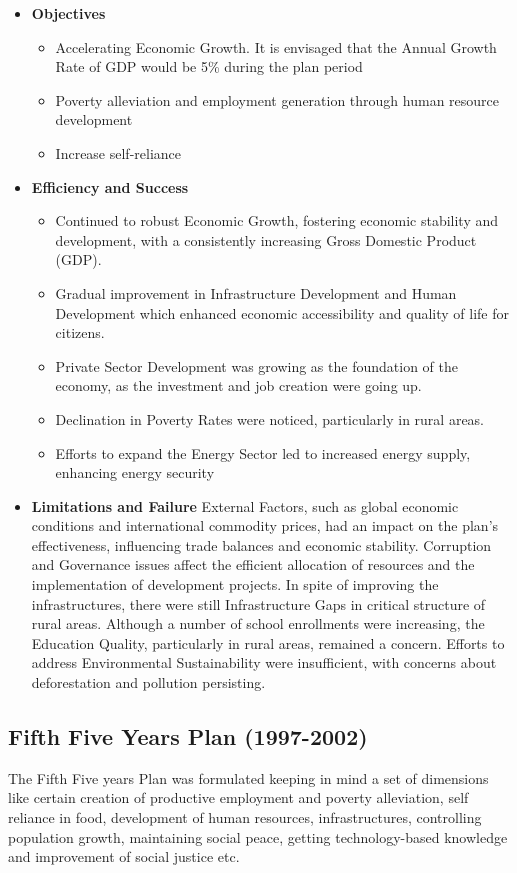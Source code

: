 \begin{itemize}
	\item\textbf{Objectives}
	\begin{itemize}
		\item Accelerating Economic Growth. It is envisaged that the Annual Growth Rate of GDP 
		would be 5\% during the plan period
		\item Poverty alleviation and employment generation through human resource development
		\item Increase self-reliance
	\end{itemize}
	
	\item\textbf{Efficiency and Success}
	\begin{itemize}
		\item Continued to robust Economic Growth, fostering economic stability and development, 
		with a consistently increasing Gross Domestic Product (GDP).
		\item Gradual improvement in Infrastructure Development and Human Development which enhanced 
		economic accessibility and quality of life for citizens.
		\item Private Sector Development was growing as the foundation of the economy, as 
		the investment and job creation were going up.
		\item Declination in Poverty Rates were noticed, particularly in rural areas.
		\item Efforts to expand the Energy Sector led to increased energy supply, enhancing energy security
	\end{itemize}
	
	\item\textbf{Limitations and Failure}
	External Factors, such as global economic conditions and international commodity prices, 
	had an impact on the plan’s effectiveness, influencing trade balances and economic stability. 
	Corruption and Governance issues affect the efficient allocation of resources and 
	the implementation of development projects. In spite of improving the infrastructures, 
	there were still Infrastructure Gaps in critical structure of rural areas.
	Although a number of school enrollments were increasing, the Education Quality, 
	particularly in rural areas, remained a concern. Efforts to address Environmental Sustainability 
	were insufficient, with concerns about deforestation and pollution persisting.
\end{itemize}


\subsection{Fifth Five Years Plan (1997-2002)}
The Fifth Five years Plan was formulated keeping in mind a set of dimensions like certain
creation of productive employment and poverty alleviation, self reliance in food, development
of human resources, infrastructures, controlling population growth, maintaining social peace,
getting technology-based knowledge and improvement of social justice etc.

